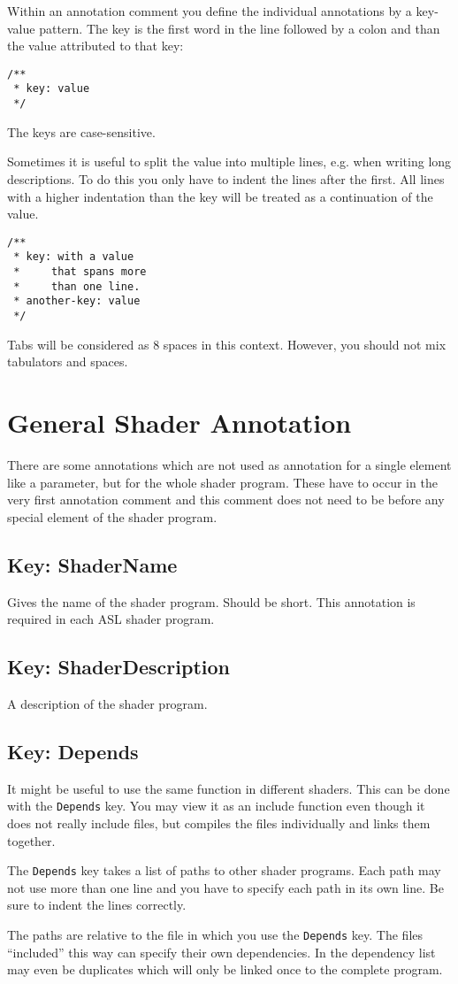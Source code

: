 \documentclass[11pt,a4paper]{scrreprt}
\newcommand{\key}[1]{\subsection{Key: #1}}
\begin{document}
Within an annotation comment you define the individual annotations by 
a key-value pattern. The key is the first word in the line followed by a colon 
and than the value attributed to that key:
\begin{lstlisting}
/**
 * key: value
 */
\end{lstlisting}
The keys are case-sensitive.

Sometimes it is useful to split the value into multiple lines, e.g. when writing 
long descriptions. To do this you only have to indent the lines after the first.  
All lines with a higher indentation than the key will be treated as 
a continuation of the value.
\begin{lstlisting}
/**
 * key: with a value
 *     that spans more
 *     than one line.
 * another-key: value
 */
\end{lstlisting}
Tabs will be considered as 8 spaces in this context. However, you should not mix 
tabulators and spaces.

\section{General Shader Annotation}
There are some annotations which are not used as annotation for a single element 
like a parameter, but for the whole shader program. These have to occur in the 
very first annotation comment and this comment does not need to be before any 
special element of the shader program.

\key{ShaderName}
Gives the name of the shader program. Should be short. This annotation is 
required in each ASL shader program.

\key{ShaderDescription}
A description of the shader program.

\key{Depends}
It might be useful to use the same function in different shaders. This can be 
done with the \lstinline$Depends$ key. You may view it as an include function 
even though it does not really include files, but compiles the files 
individually and links them together.

The \lstinline$Depends$ key takes a list of paths to other shader programs. Each 
path may not use more than one line and you have to specify each path in its own 
line. Be sure to indent the lines correctly.

The paths are relative to the file in which you use the \lstinline$Depends$ key. 
The files ``included'' this way can specify their own dependencies. In the 
dependency list may even be duplicates which will only be linked once to the 
complete program.
\end{document}
